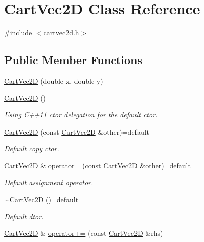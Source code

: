 \hypertarget{class_cart_vec2_d}{}\section{Cart\+Vec2D Class Reference}
\label{class_cart_vec2_d}


{\ttfamily \#include $<$cartvec2d.\+h$>$}

\subsection*{Public Member Functions}
\begin{DoxyCompactItemize}
\item 
\hyperlink{class_cart_vec2_d_a331773f726723eafc4ddbaff10195946}{Cart\+Vec2D} (double x, double y)
\item 
\hyperlink{class_cart_vec2_d_a3096b2d8c025290a5e30633000bbb315}{Cart\+Vec2D} ()
\begin{DoxyCompactList}\small\item\em Using C++11 ctor delegation for the default ctor. \end{DoxyCompactList}\item 
\hyperlink{class_cart_vec2_d_a4f749e7595a1835b4b9eb5c1e3ddc2ae}{Cart\+Vec2D} (const \hyperlink{class_cart_vec2_d}{Cart\+Vec2D} \&other)=default
\begin{DoxyCompactList}\small\item\em Default copy ctor. \end{DoxyCompactList}\item 
\hyperlink{class_cart_vec2_d}{Cart\+Vec2D} \& \hyperlink{class_cart_vec2_d_a103b408052d6d796c0ff71c74d1d4d8f}{operator=} (const \hyperlink{class_cart_vec2_d}{Cart\+Vec2D} \&other)=default
\begin{DoxyCompactList}\small\item\em Default assignment operator. \end{DoxyCompactList}\item 
\hyperlink{class_cart_vec2_d_aa0077dfbcf1d52db2c6a4e6b68c12b31}{$\sim$\+Cart\+Vec2D} ()=default
\begin{DoxyCompactList}\small\item\em Default dtor. \end{DoxyCompactList}\item 
\hyperlink{class_cart_vec2_d}{Cart\+Vec2D} \& \hyperlink{class_cart_vec2_d_a534f5059db6628f14d711b0f0f34945c}{operator+=} (const \hyperlink{class_cart_vec2_d}{Cart\+Vec2D} \&rhs)
\item 

\end{DoxyCompactItemize}
